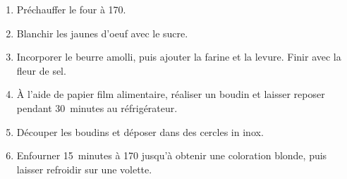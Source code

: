 
\begin{ingredients}
\end{ingredients}


\begin{recipe}
  \begin{enumerate}
  \item Préchauffer le four à 170\degreeC.
    
  \item Blanchir les jaunes d'oeuf avec le sucre.

  \item Incorporer le beurre amolli, puis ajouter la farine et la
    levure.  Finir avec la fleur de sel.

  \item À l'aide de papier film alimentaire, réaliser un boudin et
    laisser reposer pendant 30~minutes au réfrigérateur.

  \item Découper les boudins et déposer dans des cercles in inox.

  \item Enfourner 15~minutes \`a 170\degreeC{} jusqu'à obtenir une
    coloration blonde, puis laisser refroidir sur une volette.

  \end{enumerate}
\end{recipe}
